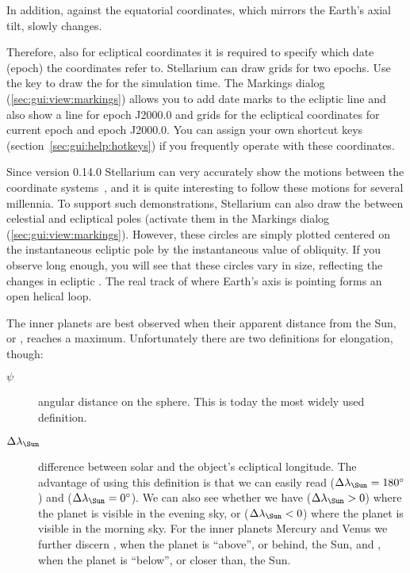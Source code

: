 In addition,  against the equatorial coordinates,
which mirrors the Earth's axial tilt, slowly changes.

Therefore, also for ecliptical coordinates it is required to specify
which date (epoch) the coordinates refer to.  Stellarium can draw grids
for two epochs. Use the \key{,} key to draw the 
for the simulation time. The Markings dialog
(\ref{sec:gui:view:markings}) allows you to add date marks to the ecliptic 
line  and also show a line for epoch
J2000.0 and grids for the ecliptical coordinates for current epoch and
epoch J2000.0. You can assign your own shortcut keys
(section~\ref{sec:gui:help:hotkeys}) if you frequently operate with
these coordinates.

Since version 0.14.0 Stellarium can very accurately show the motions
between the coordinate systems~\citep{2011AA:Vondrak, 2012AA:Vondrak}, and it is quite
interesting to follow these motions for several millennia. To support
such demonstrations, Stellarium can also draw the
 between celestial and ecliptical poles
(activate them in the Markings dialog (\ref{sec:gui:view:markings}).
However, these circles are simply plotted centered on the instantaneous
ecliptic pole by the instantaneous value of obliquity. 
If you observe long enough, you will
see that these circles vary in size, reflecting the changes in
ecliptic . The real track of where Earth's axis is pointing forms an open helical loop.

The inner planets are best observed when their apparent distance from
the Sun, or , reaches a maximum. Unfortunately
there are two definitions for elongation, though:
\begin{description}
\item[$\psi$] angular distance on the sphere. This is today the most widely used definition.
\item[$\Delta\lambda_{\text{\Sun}}$] difference between solar and the
  object's ecliptical longitude. The advantage of using this
  definition is that we can easily read 
  ($\Delta\lambda_{\text{\Sun}}=180^\circ$) and 
  ($\Delta\lambda_{\text{\Sun}}=0^\circ$). We can also see whether we have
   ($\Delta\lambda_{\text{\Sun}}>0$) where the planet is visible in the evening sky, or
   ($\Delta\lambda_{\text{\Sun}}<0$) where the planet is visible in the morning sky.
  For the inner planets Mercury and Venus
  we further discern , when the planet is ``above'', or behind, the Sun,
  and , when
  the planet is ``below'', or closer than, the Sun.
\end{description}


